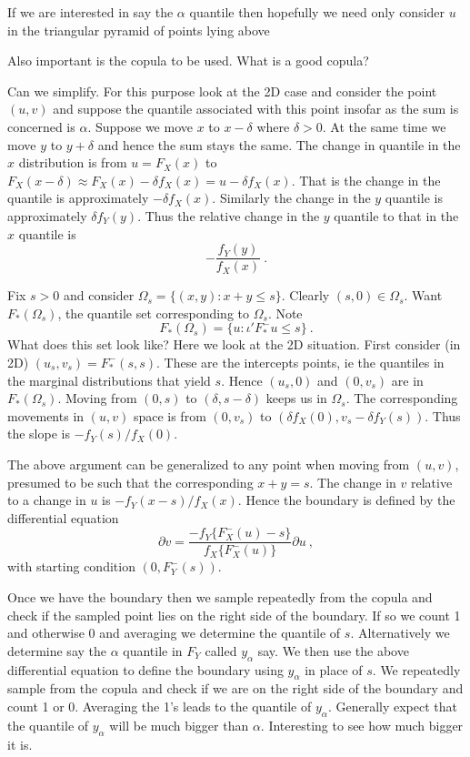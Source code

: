 \documentclass[a4paper,12pt]{article}
\begin{document}
If we are interested in say the $\alpha$ quantile then hopefully we need only consider $u$ in the triangular pyramid of points lying above

Also important is the copula to be used.  What is a good copula?

Can we simplify.   For this purpose look at the 2D case and consider the point $(u,v)$ and suppose the quantile associated with this point insofar as the sum is concerned is $\alpha$.  Suppose we move $x$ to $x-\delta$ where $\delta>0$.   At the same time we move $y$ to $y+\delta$ and hence the sum stays the same.   The change in quantile in the $x$ distribution is  from $u=F_X(x)$ to $F_X(x-\delta)\approx F_X(x)-\delta f_X(x)=u-\delta f_X(x)$.  That is the change in the quantile is approximately $-\delta f_X(x)$.   Similarly the change in the $y$ quantile is approximately $\delta f_Y(y)$.  Thus the relative change in the $y$ quantile to that in the $x$ quantile is
$$
-\frac{f_Y(y)}{f_X(x)}\ .
$$

Fix $s>0$ and consider $\Omega_s=\{(x,y): x+y\le s\}$.  Clearly $(s,0)\in \Omega_s$.  Want $F_* (\Omega_s)$, the quantile set corresponding to $\Omega_s$.  Note
$$
F_*(\Omega_s)=\{u: \iota'F_*^- u\le s\}\ .
$$
What does this set look like?  Here we look at the 2D situation.   First consider (in 2D) $(u_s,v_s)=F_*^-(s,s)$.  These are the intercepts points, ie the quantiles in the marginal distributions that yield $s$.  Hence  $(u_s,0)$ and $(0,v_s)$ are in $F_*(\Omega_s)$.  Moving from $(0,s)$ to $(\delta,s-\delta)$ keeps us in $\Omega_s$.   The corresponding movements in $(u,v)$ space is from $(0,v_s)$ to $(\delta f_X(0), v_s-\delta f_Y(s))$.  Thus the slope is $-f_Y(s)/f_X(0)$.

The above argument can be generalized to any point when moving from $(u,v)$, presumed to be such that the corresponding $x+y=s$.  The change in $v$ relative to a change in $u$ is $-f_Y(x-s)/f_X(x)$.  Hence the boundary is defined by the differential equation
$$
\partial v=\frac{-f_Y\{F_X^-(u)-s\}}{f_X\{F_X^-(u)\}}\partial u\ ,
$$
with starting condition $(0,F_Y^-(s))$.

Once we have the boundary then we sample repeatedly from the copula and check if the sampled point lies on the right side of the boundary.   If so we count 1 and otherwise 0 and averaging we determine the quantile of $s$.  Alternatively we determine say the $\alpha$ quantile in $F_Y$ called $y_\alpha$ say.  We then use the above differential equation to define the boundary using $y_\alpha$ in place of $s$.  We repeatedly sample from the copula and check if we are on the right side of the boundary and count 1 or 0.   Averaging the 1's leads to the quantile of $y_\alpha$.  Generally expect that the quantile of $y_\alpha$ will be much bigger than $\alpha$.  Interesting to see how much bigger it is.
\end{document}
